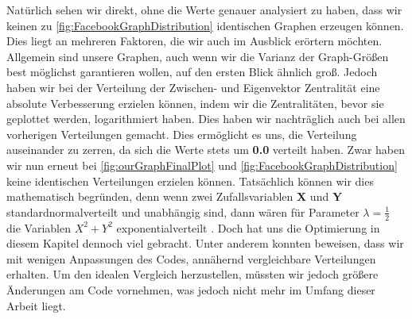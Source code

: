 Natürlich sehen wir direkt, ohne die Werte genauer analysiert zu haben, dass wir keinen zu \ref{fig:FacebookGraphDistribution} identischen Graphen erzeugen können. Dies liegt an mehreren Faktoren, die wir auch im Ausblick erörtern möchten. Allgemein sind unsere Graphen, auch wenn wir die Varianz der Graph-Größen best möglichst garantieren wollen, auf den ersten Blick ähnlich groß. Jedoch haben wir bei der Verteilung der Zwischen- und Eigenvektor Zentralität eine absolute Verbesserung erzielen können, indem wir die Zentralitäten, bevor sie geplottet werden, logarithmiert haben. Dies haben wir nachträglich auch bei allen vorherigen Verteilungen gemacht. Dies ermöglicht es uns, die Verteilung auseinander zu zerren, da sich die Werte stets um \textbf{0.0} verteilt haben. Zwar haben wir nun erneut bei \ref{fig:ourGraphFinalPlot} und \ref{fig:FacebookGraphDistribution} keine identischen Verteilungen erzielen können. Tatsächlich können wir dies mathematisch begründen, denn wenn zwei Zufallsvariablen \textbf{X} und \textbf{Y} standardnormalverteilt und unabhängig sind, dann wären für Parameter $\lambda = \frac{1}{2}$ die Variablen $X^2+Y^2$ exponentialverteilt \cite{verteilung}. Doch hat uns die Optimierung in diesem Kapitel dennoch viel gebracht. Unter anderem konnten beweisen, dass wir mit wenigen Anpassungen des Codes, annähernd vergleichbare Verteilungen erhalten. Um den idealen Vergleich herzustellen, müssten wir jedoch größere Änderungen am Code vornehmen, was jedoch nicht mehr im Umfang dieser Arbeit liegt. 



